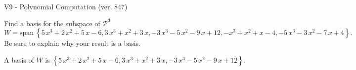 \begin{exercise}
  \begin{exerciseTitle}V9 - Polynomial Computation (ver. 847)\end{exerciseTitle}
  \begin{exerciseStatement}
    Find a basis for the subspace of \(\mathcal{P}^3\) 
\[W=\mathrm{span}\ \left\{5 \, x^{3} + 2 \, x^{2} + 5 \, x - 6 , 3 \, x^{3} + x^{2} + 3 \, x , -3 \, x^{3} - 5 \, x^{2} - 9 \, x + 12 , -x^{3} + x^{2} + x - 4 , -5 \, x^{3} - 3 \, x^{2} - 7 \, x + 4\right\}.\]
 Be sure to explain why your result is a basis.


  \end{exerciseStatement}
  \begin{exerciseAnswer}
   A basis of \(W\) is  \(\left\{5 \, x^{3} + 2 \, x^{2} + 5 \, x - 6 , 3 \, x^{3} + x^{2} + 3 \, x , -3 \, x^{3} - 5 \, x^{2} - 9 \, x + 12\right\}\).
  


  \end{exerciseAnswer}
\end{exercise}